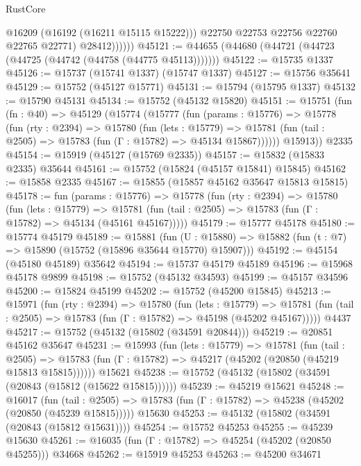 \begin{lexlean}{RustCore}
\begin{coremodule}
                    @16209
                    (@16192 (@16211 @15115 @15222)))
                  @22750
                  @22753
                  @22756
                  @22760
                  @22765
                  @22771)
                @28412))))))
@45121 := @44655 (@44680 (@44721 (@44723 (@44725 (@44742 (@44758 (@44775 @45113)))))))
@45122 := @15735 @1337
@45126 := @15737 (@15741 @1337) (@15747 @1337)
@45127 := @15756 @35641
@45129 := @15752 (@45127 @15771)
@45131 := @15794 (@15795 @1337)
@45132 := @15790 @45131
@45134 := @15752 (@45132 @15820)
@45151 := @15751
    (fun (fn : @40) =>
    @45129
      (@15774
        (@15777
          (fun (params : @15776) =>
          @15778
            (fun (rty : @2394) =>
            @15780
              (fun (lets : @15779) =>
              @15781 (fun (tail : @2505) => @15783 (fun (Γ : @15782) => @45134 @15867))))))
        @15913))
    @2335
@45154 := @15919 (@45127 (@15769 @2335))
@45157 := @15832 (@15833 @2335) @35644
@45161 := @15752 (@15824 (@45157 @15841) @15845)
@45162 := @15858 @2335
@45167 := @15855 (@15857 @45162 @35647 @15813 @15815)
@45178 := fun (params : @15776) =>
  @15778
    (fun (rty : @2394) =>
    @15780
      (fun (lets : @15779) =>
      @15781 (fun (tail : @2505) => @15783 (fun (Γ : @15782) => @45134 (@45161 @45167)))))
@45179 := @15777 @45178
@45180 := @15774 @45179
@45189 := @15881
    (fun (U : @15880) => @15882 (fun (t : @7) => @15890 (@15752 (@15896 @35644 @15770) @15907)))
@45192 := @45154 (@45180 @45189) @35642
@45194 := @15737 @45179 @45189
@45196 := @15968 @45178 @9899
@45198 := @15752 (@45132 @34593)
@45199 := @45157 @34596
@45200 := @15824 @45199
@45202 := @15752 (@45200 @15845)
@45213 := @15971
    (fun (rty : @2394) =>
    @15780
      (fun (lets : @15779) =>
      @15781 (fun (tail : @2505) => @15783 (fun (Γ : @15782) => @45198 (@45202 @45167)))))
    @4437
@45217 := @15752 (@45132 (@15802 (@34591 @20844)))
@45219 := @20851 @45162 @35647
@45231 := @15993
    (fun (lets : @15779) =>
    @15781
      (fun (tail : @2505) =>
      @15783 (fun (Γ : @15782) => @45217 (@45202 (@20850 (@45219 @15813 @15815))))))
    @15621
@45238 := @15752 (@45132 (@15802 (@34591 (@20843 (@15812 (@15622 @15815))))))
@45239 := @45219 @15621
@45248 := @16017
    (fun (tail : @2505) => @15783 (fun (Γ : @15782) => @45238 (@45202 (@20850 (@45239 @15815)))))
    @15630
@45253 := @45132 (@15802 (@34591 (@20843 (@15812 @15631))))
@45254 := @15752 @45253
@45255 := @45239 @15630
@45261 := @16035 (fun (Γ : @15782) => @45254 (@45202 (@20850 @45255))) @34668
@45262 := @15919 @45253
@45263 := @45200 @34671

\end{coremodule}
\end{lexlean}
